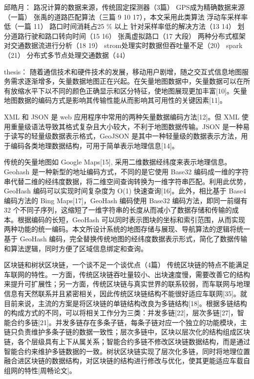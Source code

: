 邱皓月：
路况计算的数据来源，传统固定探测器（3篇）
GPS成为精确数据来源（一篇）
张禹的道路匹配算法（三篇 9 10 17），本文采用此类算法
浮动车采样率低（一篇 11）  
路口时间消耗占25 \% 以上
针对采样率低的解决方法（13 14）
划分道路行驶和路口转向时间（15 16）
张禹虚拟路口（17 大段）
两种分布式框架对交通数据流进行分析（18 19）
strom处理实时数据但吞吐量不足（20）
spark（21）
分布式多节点处理交通数据（44）

thesis：
随着通信技术和硬件技术的发展，移动用户剧增，随之交互式信息地图服务需求逐渐增多，矢量数据地图正在兴起。在矢量地图数据中，矢量数据可以在所有放缩水平下以不同的颜色正确显示和区分特征，使地图展现更加丰富[10]。矢量地图数据的编码方式是影响其传输性能从而影响其可用性的关键因素[11]。\par
XML 和 JSON 是 web 应用程序中常用的两种矢量数据编码方法[12]。但 XML 使用重量级语法导致其格式复杂且大小较大，不利于地图数据传输。JSON 是一种易于读写的轻量级数据表示格式，GeoJSON 是其中一种轻量级的数据表示方法，用于编码各类地理数据结构，可用于简单表示地理信息[14]。\par
传统的矢量地图如 Google Maps[15], 采用二维数据经纬度来表示地理信息。Geohash 是一种新型的地址编码方式，不同的是它使用 Base32 编码成一维的字符串代替二维的经纬度数据，将二维空间查询转换为一维字符串匹配。利用此优势，GeoHash 编码可以实现时间复杂度为 O(1) 快速查询[16]。此外，相比基于 Base4 编码方法的 Bing Maps[17]，GeoHash 编码使用 Base32 编码方法，即同一前缀有 32 个不同子序列，这缩短了一维字符串的长度从而减小了数据存储和传输的成本。根据编码的长短，GeoHash 可以同时表示图块的坐标和索引范围，从而实现两种功能的统一编码。本文所设计系统的地图存储与展现、导航算法的逻辑将统一基于 GeoHash 编码，完全替换传统地图的经纬度数据表示形式，简化了数据传输和算法逻辑，同时方便了区域信息绑定和查询。\par


区块链和树状区块链，一个谈不足一个谈优点（4篇）
传统区块链的特点不能满足车联网的特性。一方面，传统区块链吞吐量较小、出块速度慢，需要改善它的结构来提升可扩展性；另一方面，传统区块链与真实世界的联系较弱，而车联网与地理信息有天然联系并且紧密相关，因此传统区块链结构不能很好适应车联网[35]。就目前来说，主流的方案是将区块链的单链结构改良为多链结构[18]。根据多链结构的构成方式的不同，可以将相关工作分为三类：并发多链[22]，层次多链[27]，智能合约多链[21]。并发多链存在多条子链，每条子链对应一个独立的功能模块，主链只负责维护多条子链的数据一致性；层次多链中，区块以层次化的结构组成区块链，各个层级具有上下从属关系；智能合约多链不修改区块链数据结构，而是通过智能合约来维护多链数据的一致。树状区块链实现了层次化多链，同时将地理位置融合进区块链的数据结构，对区块链的结构进行修改与优化，使其更能适应车载自组网的特性[周畅论文]。



